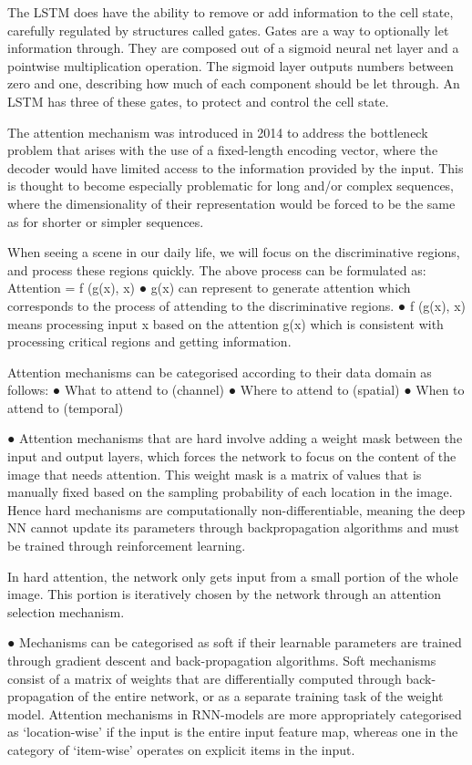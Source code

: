 The LSTM does have the ability to remove or add information to the cell
state, carefully regulated by structures called gates.
Gates are a way to optionally let information through. They are composed out
of a sigmoid neural net layer and a pointwise multiplication operation.
The sigmoid layer outputs numbers between
zero and one, describing how much of each
component should be let through.
An LSTM has three of these gates, to protect
and control the cell state.

The attention mechanism was introduced in 2014 to address the bottleneck
problem that arises with the use of a fixed-length encoding vector, where the
decoder would have limited access to the information provided by the input.
This is thought to become especially problematic for long and/or complex
sequences, where the dimensionality of their representation would be forced to
be the same as for shorter or simpler sequences.

When seeing a scene in our daily life, we will focus on the discriminative
regions, and process these regions quickly.
The above process can be formulated as:
Attention = f (g(x), x)
● g(x) can represent to generate attention which corresponds to the
process of attending to the discriminative regions.
● f (g(x), x) means processing input x based on the attention g(x) which
is consistent with processing critical regions and getting information.

Attention mechanisms can be categorised according to their data domain as
follows:
● What to attend to (channel)
● Where to attend to (spatial)
● When to attend to (temporal)

● Attention mechanisms that are hard involve adding a weight mask
between the input and output layers, which forces the network to focus on
the content of the image that needs attention.
This weight mask is a matrix of values that is manually fixed based on the
sampling probability of each location in the image.
Hence hard mechanisms are computationally non-differentiable, meaning
the deep NN cannot update its parameters through backpropagation
algorithms and must be trained through reinforcement learning.

In hard attention, the network only
gets input from a small portion of the
whole image. This portion is iteratively
chosen by the network through an
attention selection mechanism.

● Mechanisms can be categorised as soft if their learnable parameters are
trained through gradient descent and back-propagation algorithms.
Soft mechanisms consist of a matrix of weights that are differentially
computed through back-propagation of the entire network, or as a
separate training task of the weight model.
Attention mechanisms in RNN-models are more appropriately categorised
as ‘location-wise’ if the input is the entire input feature map, whereas one
in the category of ‘item-wise’ operates on explicit items in the input.

